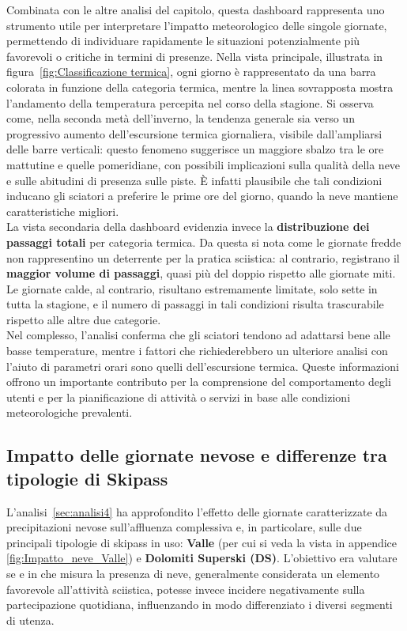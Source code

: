 Combinata con le altre analisi del capitolo, questa dashboard rappresenta uno strumento utile per interpretare l’impatto meteorologico delle singole giornate, permettendo di individuare rapidamente le situazioni potenzialmente più favorevoli o critiche in termini di presenze.  
Nella vista principale, illustrata in figura~\ref{fig:Classificazione termica}, ogni giorno è rappresentato da una barra colorata in funzione della categoria termica, mentre la linea sovrapposta mostra l’andamento della temperatura percepita nel corso della stagione.  
Si osserva come, nella seconda metà dell’inverno, la tendenza generale sia verso un progressivo aumento dell’escursione termica giornaliera, visibile dall’ampliarsi delle barre verticali: questo fenomeno suggerisce un maggiore sbalzo tra le ore mattutine e quelle pomeridiane, con possibili implicazioni sulla qualità della neve e sulle abitudini di presenza sulle piste.  
È infatti plausibile che tali condizioni inducano gli sciatori a preferire le prime ore del giorno, quando la neve mantiene caratteristiche migliori.\\

La vista secondaria della dashboard evidenzia invece la \textbf{distribuzione dei passaggi totali} per categoria termica.  
Da questa si nota come le giornate fredde non rappresentino un deterrente per la pratica sciistica: al contrario, registrano il \textbf{maggior volume di passaggi}, quasi più del doppio rispetto alle giornate miti.  
Le giornate calde, al contrario, risultano estremamente limitate, solo sette in tutta la stagione, e il numero di passaggi in tali condizioni risulta trascurabile rispetto alle altre due categorie. \\ 

Nel complesso, l’analisi conferma che gli sciatori tendono ad adattarsi bene alle basse temperature, mentre i fattori che richiederebbero un ulteriore analisi con l'aiuto di parametri orari sono quelli dell'escursione termica.
Queste informazioni offrono un importante contributo per la comprensione del comportamento degli utenti e per la pianificazione di attività o servizi in base alle condizioni meteorologiche prevalenti.


\subsection*{Impatto delle giornate nevose e differenze tra tipologie di Skipass}
L’analisi~\ref{sec:analisi4} ha approfondito l’effetto delle giornate caratterizzate da precipitazioni nevose sull’affluenza complessiva e, in particolare, sulle due principali tipologie di skipass in uso: \textbf{Valle} (per cui si veda la vista in appendice \ref{fig:Impatto_neve_Valle}) e \textbf{Dolomiti Superski (DS)}.  
L’obiettivo era valutare se e in che misura la presenza di neve, generalmente considerata un elemento favorevole all’attività sciistica, potesse invece incidere negativamente sulla partecipazione quotidiana, influenzando in modo differenziato i diversi segmenti di utenza.\\

